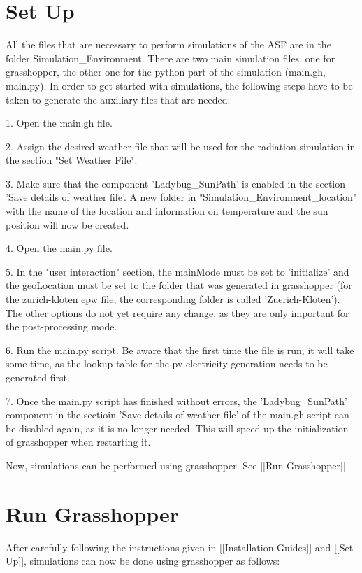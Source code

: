 {\section{Set Up}

	All the files that are necessary to perform simulations of the ASF are in the folder Simulation_Environment. There are two main simulation files, one for grasshopper, the other one for the python part of the simulation (main.gh, main.py). In order to get started with simulations, the following steps have to be taken to generate the auxiliary files that are needed:

	1. Open the main.gh file.  

	2. Assign the desired weather file that will be used for the radiation simulation in the section "Set Weather File". 

	3. Make sure that the component 'Ladybug_SunPath' is enabled in the section 'Save details of weather file'. A new folder in "Simulation_Environment\data\geographical_location" with the name of the location and information on temperature and the sun position will now be created. 

	4. Open the main.py file.

	5. In the "user interaction" section, the mainMode must be set to 'initialize' and the geoLocation must be set to the folder that was generated in grasshopper (for the zurich-kloten epw file, the corresponding folder is called 'Zuerich-Kloten'). The other options do not yet require any change, as they are only important for the post-processing mode.

	6. Run the main.py script. Be aware that the first time the file is run, it will take some time, as the lookup-table for the pv-electricity-generation needs to be generated first.

	7. Once the main.py script has finished without errors, the 'Ladybug_SunPath' component in the sectioin 'Save details of weather file' of the main.gh script can be disabled again, as it is no longer needed. This will speed up the initialization of grasshopper when restarting it. 

	Now, simulations can be performed using grasshopper. See [[Run Grasshopper]]

\section{Run Grasshopper}

	After carefully following the instructions given in [[Installation Guides]] and [[Set-Up]], simulations can now be done using grasshopper as follows:

}

